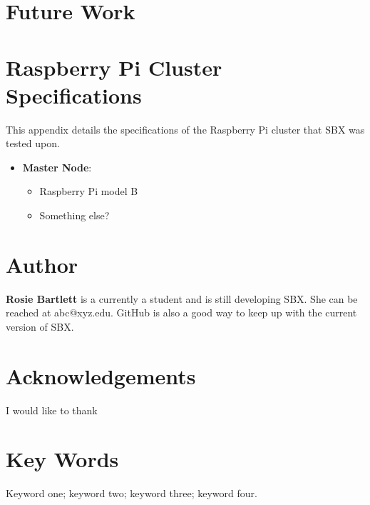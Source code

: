 \documentclass{hehe}
\begin{document}
\section{Future Work}



\appendix
\section{Raspberry Pi Cluster Specifications}
This appendix details the specifications of the Raspberry Pi cluster that SBX was tested upon.

\begin{itemize}
  \item \textbf{Master Node}:\\
  \begin{itemize}
    \item Raspberry Pi model B
    \item Something else?
  \end{itemize}
\end{itemize}



\printbibliography

\section*{Author}
\begin{authorbio}

\textbf{Rosie Bartlett} is a currently a student and is still developing SBX. She can be reached at abc@xyz.edu. GitHub is also a good way to keep up with the current version of SBX.
\end{authorbio}

\section*{Acknowledgements}
I would like to thank

\section*{Key Words}
Keyword one; keyword two; keyword three; keyword four.
\end{document}
